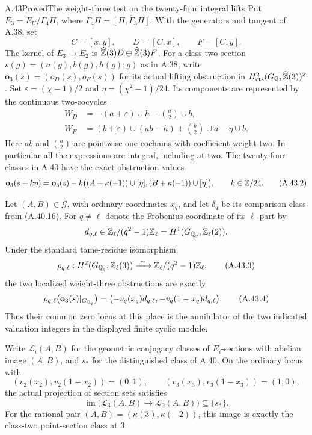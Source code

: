 \begin{statement}{A.43}{Proved}{The weight-three test on the twenty-four integral lifts}
Put $E_3=E_U/\Gamma_4\Pi$, where
$\Gamma_4\Pi=\overline{[\Pi,\Gamma_3\Pi]}$.  With the generators
and tangent of A.38, set
\[
 C=[x,y],\qquad D=[C,x],\qquad F=[C,y].
\]
The kernel of $E_3\to E_2$ is
$\widehat{\mathbb Z}(3)D\oplus\widehat{\mathbb Z}(3)F$.
For a class-two section $s(g)=(a(g),b(g),h(g);g)$ as in A.38,
write $\mathbf o_3(s)=(o_D(s),o_F(s))$ for its actual lifting
obstruction in $H^2_{\rm cts}(G_\mathbb Q,\widehat{\mathbb Z}(3))^2$.
Set $\varepsilon=(\chi-1)/2$ and $\eta=(\chi^2-1)/24$.
Its components are represented by the continuous two-cocycles
\[
 \begin{split}
 W_D&=-(a+\varepsilon)\cup h-\binom a2\cup b,\\
 W_F&=(b+\varepsilon)\cup(ab-h)+\binom b2\cup a-\eta\cup b.
 \end{split}
 \tag{A.43.1}
\]
Here $ab$ and $\binom a2$ are pointwise one-cochains with
coefficient weight two.  In particular all the expressions are
integral, including at two.  The twenty-four classes in A.40
have the exact obstruction values
\[
 \mathbf o_3(s+k\eta)=\mathbf o_3(s)
   -k\bigl((A+\kappa(-1))\cup[\eta],
           (B+\kappa(-1))\cup[\eta]\bigr),
                    \qquad k\in\mathbb Z/24.
 \tag{A.43.2}
\]

Let $(A,B)\in\mathcal G$, with ordinary coordinates $x_q$, and
let $\delta_q$ be its comparison class from (A.40.16).  For
$q\ne\ell$ denote the Frobenius coordinate of its $\ell$-part
by
\[
 d_{q,\ell}\in\mathbb Z_\ell/(q^2-1)\mathbb Z_\ell
       =H^1(G_{\mathbb Q_q},\mathbb Z_\ell(2)).
\]
Under the standard tame-residue isomorphism
\[
 \rho_{q,\ell}:H^2(G_{\mathbb Q_q},\mathbb Z_\ell(3))
       \xrightarrow{\ \sim\ }\mathbb Z_\ell/(q^2-1)\mathbb Z_\ell,
 \tag{A.43.3}
\]
the two localized weight-three obstructions are exactly
\[
 \rho_{q,\ell}\bigl(\mathbf o_3(s)|_{G_{\mathbb Q_q}}\bigr)
   =\bigl(-v_q(x_q)d_{q,\ell},
           -v_q(1-x_q)d_{q,\ell}\bigr).
 \tag{A.43.4}
\]
Thus their common zero locus at this place is the annihilator
of the two indicated valuation integers in the displayed finite
cyclic module.

Write $\mathscr L_i(A,B)$ for the geometric conjugacy classes
of $E_i$-sections with abelian image $(A,B)$, and $s_*$ for the
distinguished class of A.40.  On the ordinary locus with
\[
 (v_2(x_2),v_2(1-x_2))=(0,1),\qquad
 (v_3(x_3),v_3(1-x_3))=(1,0),
 \tag{A.43.5}
\]
the actual projection of section sets satisfies
\[
 \operatorname{im}\bigl(\mathscr L_3(A,B)\longrightarrow
                      \mathscr L_2(A,B)\bigr)\subseteq\{s_*\}.
 \tag{A.43.6}
\]
For the rational pair $(A,B)=(\kappa(3),\kappa(-2))$, this
image is exactly the class-two point-section class at $3$.
\end{statement}

